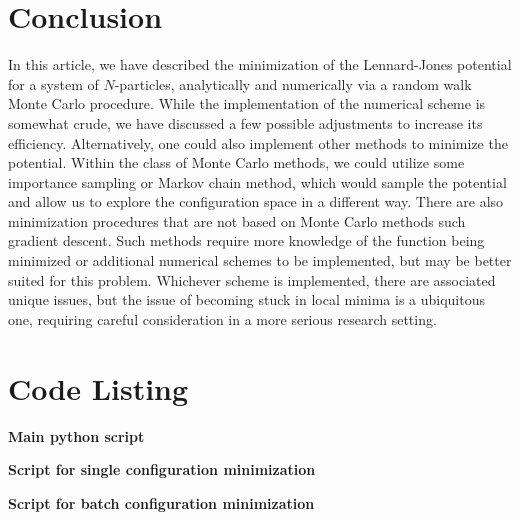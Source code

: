 \section{Conclusion}

In this article, we have described the minimization of the Lennard-Jones potential for a system of $N$-particles, analytically and numerically via a random walk Monte Carlo procedure.
While the implementation of the numerical scheme is somewhat crude, we have discussed a few possible adjustments to increase its efficiency.
Alternatively, one could also implement other methods to minimize the potential.
Within the class of Monte Carlo methods, we could utilize some importance sampling or Markov chain method, which would sample the potential and allow us to explore the configuration space in a different way.
There are also minimization procedures that are not based on Monte Carlo methods such gradient descent.
Such methods require more knowledge of the function being minimized or additional numerical schemes to be implemented, but may be better suited for this problem.
Whichever scheme is implemented, there are associated unique issues, but the issue of becoming stuck in local minima is a ubiquitous one, requiring careful consideration in a more serious research setting.

\appendix

\section{Code Listing}
\label{app:code-listing}

\textbf{Main python script}

\textbf{Script for single configuration minimization}

\textbf{Script for batch configuration minimization}

    

